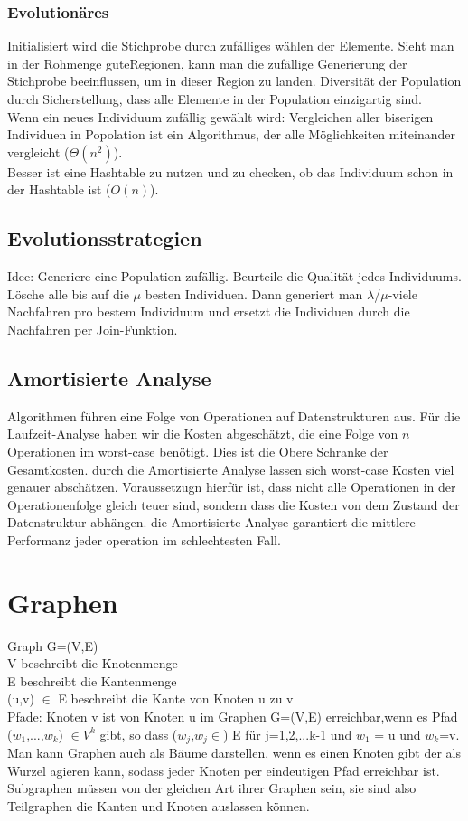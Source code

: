 \documentclass[jou,apacite]{apa6}
\begin{document}
\subsubsection{Evolutionäres}
Initialisiert wird die Stichprobe durch zufälliges wählen der Elemente. Sieht man in der Rohmenge \dq gute\dq  Regionen, kann man die zufällige Generierung der Stichprobe beeinflussen, um in dieser Region zu landen. Diversität der Population durch Sicherstellung, dass alle Elemente in der Population einzigartig sind. \\
Wenn ein neues Individuum zufällig gewählt wird:
Vergleichen aller biserigen Individuen in Popolation ist ein Algorithmus, der alle Möglichkeiten miteinander vergleicht ($\Theta(n^2)$). \\ Besser ist eine Hashtable zu nutzen und zu checken, ob das Individuum schon in der Hashtable ist ($O(n)$).

\subsection{Evolutionsstrategien}
Idee: Generiere eine Population zufällig. Beurteile die Qualität jedes Individuums. Lösche alle bis auf die $\mu$ besten Individuen. Dann generiert man $\lambda$/$\mu$-viele Nachfahren pro bestem Individuum und ersetzt die Individuen durch die Nachfahren per Join-Funktion.

\subsection{Amortisierte Analyse}
Algorithmen führen eine Folge von Operationen auf Datenstrukturen aus. Für die Laufzeit-Analyse haben wir die Kosten abgeschätzt, die eine Folge von $n$ Operationen im worst-case benötigt. Dies ist die Obere Schranke der Gesamtkosten. durch die Amortisierte Analyse lassen sich worst-case Kosten viel genauer abschätzen. Voraussetzugn hierfür ist, dass nicht alle Operationen in der Operationenfolge gleich teuer sind, sondern dass die Kosten von dem Zustand der Datenstruktur abhängen. die Amortisierte Analyse garantiert die mittlere Performanz jeder operation im schlechtesten Fall. 

\section{Graphen}
Graph G=(V,E)\\
V beschreibt die Knotenmenge \\
E beschreibt die Kantenmenge \\
(u,v) $\in$ E beschreibt die Kante von Knoten u zu v \\
Pfade: Knoten v ist von Knoten u im Graphen G=(V,E) erreichbar,wenn es Pfad ($w_{1}$,...,$w_{k}$) $\in V^{k}$ gibt, so dass ($w_{j}$,$w_{j} \in$) E für j=1,2,...k-1 und $w_{1}$ = u und $w_{k}$=v. \\
Man kann Graphen auch als Bäume darstellen, wenn es einen Knoten gibt der als Wurzel agieren kann, sodass jeder Knoten per eindeutigen Pfad erreichbar ist. \\
Subgraphen müssen von der gleichen Art ihrer Graphen sein, sie sind also Teilgraphen die Kanten und Knoten auslassen können.
\end{document}

